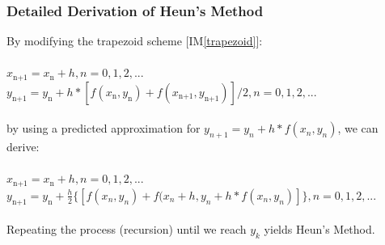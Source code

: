 \documentclass[12pt]{article}
\newcommand{\iref}[1]{IM\ref{#1}}
\begin{document}
\subsubsection*{Detailed Derivation of Heun's Method}

By modifying the trapezoid scheme [\iref{trapezoid}]:\\
\\
\hspace*{2ex}$x_\text{n+1} = x_\text{n} + h, n = 0, 1, 2,...$\\
\hspace*{2ex}$y_\text{n+1} = y_\text{n} + h*[f(x_\text{n}, y_\text{n})+f(x_\text{n+1},
y_\text{n+1})] / 2, n = 0, 1, 2,...$\\
\\
by using a predicted approximation for $y_{n+1} = y_n + h * f(x_n, y_n)$, we can derive:\\
\\
\hspace*{2ex}$x_\text{n+1} = x_\text{n} + h, n = 0, 1, 2,...$\\
\hspace*{2ex}$y_\text{n+1} = y_\text{n} + \frac{h}{2}\{[f(x_n, y_n) + f(x_n + h, y_n + h*f(x_n, y_n)]\}, n = 0, 1, 2,...$\\
\\
Repeating the process (recursion) until we reach $y_k$ yields Heun's Method.\\

~\newline

\end{document}
